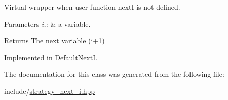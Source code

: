 \-Virtual wrapper when user function next\-I is not defined. 


\begin{DoxyParams}{\-Parameters}
{\em i,\-:} & a variable. \\
\hline
\end{DoxyParams}
\begin{DoxyReturn}{\-Returns}
\-The next variable (i+1) 
\end{DoxyReturn}


\-Implemented in \hyperlink{classDefaultNextI_aa44893d3fa6e8b167774ff85d798ec3b}{\-Default\-Next\-I}.



\-The documentation for this class was generated from the following file\-:\begin{DoxyCompactItemize}
\item 
include/\hyperlink{strategy__next__i_8hpp}{strategy\-\_\-next\-\_\-i.\-hpp}\end{DoxyCompactItemize}

